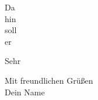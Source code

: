 \documentclass[testlco]{scrlttr2}
\begin{document}
	\begin{letter}{Da\\hin\\soll\\er}
		\opening{Sehr }
		\closing{Mit freundlichen Grüßen \\Dein Name}
	\end{letter}
\end{document}
